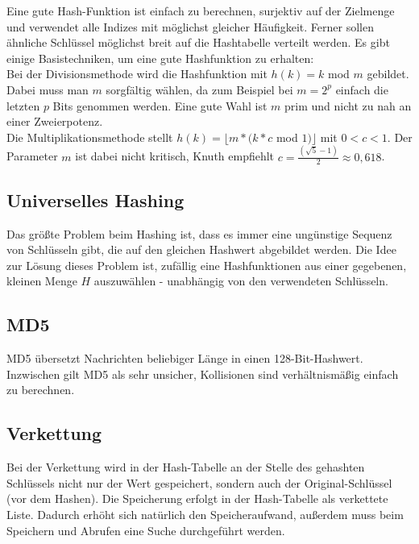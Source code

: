 \documentclass[12pt]{article}
\begin{document}
Eine gute Hash-Funktion ist einfach zu berechnen, surjektiv auf der Zielmenge und verwendet alle Indizes mit möglichst gleicher Häufigkeit. Ferner sollen ähnliche Schlüssel möglichst breit auf die Hashtabelle verteilt werden. Es gibt einige Basistechniken, um eine gute Hashfunktion zu erhalten:\\

Bei der Divisionsmethode wird die Hashfunktion mit $h(k) = k$ mod $m$ gebildet. Dabei muss man $m$ sorgfältig wählen, da zum Beispiel bei $m = 2^p$ einfach die letzten $p$ Bits genommen werden. Eine gute Wahl ist $m$ prim und nicht zu nah an einer Zweierpotenz.\\

Die Multiplikationsmethode stellt $h(k) = \lfloor{}m * (k * c$ mod $1)\rfloor$ mit $0 < c < 1$. Der Parameter $m$ ist dabei nicht kritisch, Knuth empfiehlt $c = \frac{(\sqrt{5} - 1)}{2} \approx 0,618$.

\subsection{Universelles Hashing}

Das größte Problem beim Hashing ist, dass es immer eine ungünstige Sequenz von Schlüsseln gibt, die auf den gleichen Hashwert abgebildet werden. Die Idee zur Lösung dieses Problem ist, zufällig eine Hashfunktionen aus einer gegebenen, kleinen Menge $H$ auszuwählen - unabhängig von den verwendeten Schlüsseln.

\subsection{MD5}

MD5 übersetzt Nachrichten beliebiger Länge in einen 128-Bit-Hashwert. Inzwischen gilt MD5 als sehr unsicher, Kollisionen sind verhältnismäßig einfach zu berechnen.

\subsection{Verkettung}

Bei der Verkettung wird in der Hash-Tabelle an der Stelle des gehashten Schlüssels nicht nur der Wert gespeichert, sondern auch der Original-Schlüssel (vor dem Hashen). Die Speicherung erfolgt in der Hash-Tabelle als verkettete Liste. Dadurch erhöht sich natürlich den Speicheraufwand, außerdem muss beim Speichern und Abrufen eine Suche durchgeführt werden.
\end{document}
